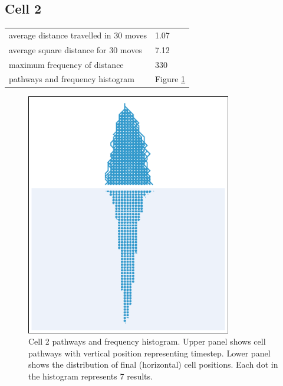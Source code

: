 \documentclass[11pt,a4paper]{article}
\newcommand \bt{\begin{longtable}{p{0.65\textwidth}p{0.25\textwidth}}}
\newcommand \et{\end{longtable}}
\begin{document}
\subsection*{Cell 2}
\bt
average distance travelled in 30 moves &  1.07\\
average square distance for 30 moves & 7.12\\
maximum frequency of distance & 330\\
pathways and frequency histogram & Figure \ref{fig2}
\et
\begin{figure}[htbp]
\begin{center}
\includegraphics[width=0.8\textwidth]{CA30_R40L40_2.eps}
\caption{Cell 2 pathways and frequency histogram. Upper panel shows cell pathways with vertical position representing timestep. 
Lower panel shows the distribution of final (horizontal) cell positions. Each dot in the histogram represents 7 results.}
\label{fig2}
\end{center}
\end{figure}
\end{document}
